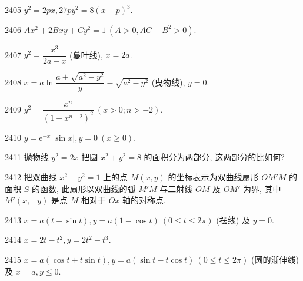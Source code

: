 \begin{prob}[S]{2405}
$y^2 = 2px, 27py^2 = 8(x - p)^3$.
\end{prob}

\begin{prob}[S]{2406}
$Ax^2 + 2Bxy + Cy^2 = 1\ (A > 0, AC - B^2 > 0)$.
\end{prob}

\begin{prob}[S]{2407}
$y^2 = \dfrac{x^3}{2a - x}$ (蔓叶线), $x = 2a$.
\end{prob}

\begin{prob}[S]{2408}
$x = a \ln \dfrac{a + \sqrt{a^2 - y^2}}{y} - \sqrt{a^2 - y^2}$ (曳物线), $y = 0$.
\end{prob}

\begin{prob}[S]{2409}
$y^2 = \dfrac{x^n}{(1 + x^{n+2})^2}\ (x > 0; n > -2)$.
\end{prob}

\begin{prob}[S]{2410}
$y = \mathrm{e}^{-x} |\sin x|, y = 0\ (x \geqslant 0)$.
\end{prob}

\begin{prob}[M]{2411}
抛物线 $y^2 = 2x$ 把圆 $x^2 + y^2 = 8$ 的面积分为两部分, 这两部分的比如何?
\end{prob}

\begin{prob}[M]{2412}
把双曲线 $x^2 - y^2 = 1$ 上的点 $M(x, y)$ 的坐标表示为双曲线扇形 $OM'M$ 的面积 $S$ 的函数, 此扇形以双曲线的弧 $M'M$ 与二射线 $OM$ 及 $OM'$ 为界, 其中 $M'(x, -y)$ 是点 $M$ 相对于 $Ox$ 轴的对称点.
\end{prob}


\begin{prob}[S]{2413}
$x = a(t - \sin t), y = a(1 - \cos t)\ (0 \leqslant t \leqslant 2\pi)$ (摆线) 及 $y = 0$.
\end{prob}

\begin{prob}[S]{2414}
$x = 2t - t^2, y = 2t^2 - t^3$.
\end{prob}

\begin{prob}[S]{2415}
$x = a(\cos t + t \sin t), y = a(\sin t - t \cos t)\ (0 \leqslant t \leqslant 2\pi)$ (圆的渐伸线) 及 $x = a, y \leqslant 0$.
\end{prob}

